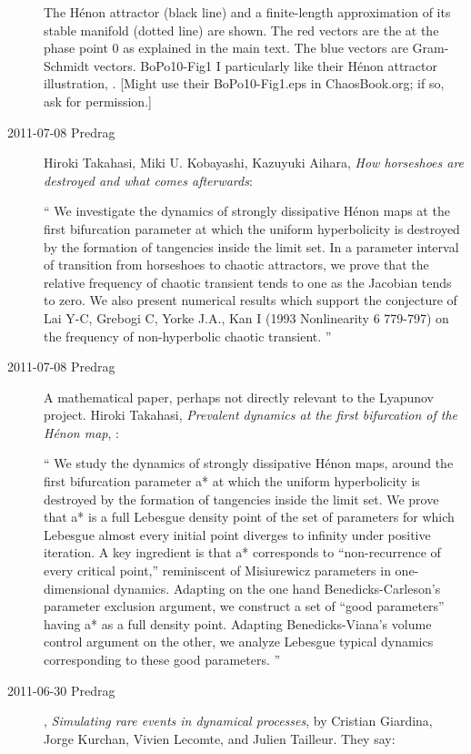 \begin{description}
%
 {}{
The H\'enon attractor (black line) and a finite-length approximation of
its stable manifold (dotted line) are shown. The red vectors are the
{\cLvs} at the phase point 0 as explained in the main text. The
blue vectors are Gram-Schmidt vectors.
}{BoPo10-Fig1}
%
I particularly like their H\'enon attractor illustration,
. [Might use their BoPo10-Fig1.eps in ChaosBook.org;
if so, ask for permission.]

\item[2011-07-08 Predrag]
Hiroki Takahasi, Miki U. Kobayashi, Kazuyuki Aihara,
\emph{How horseshoes are destroyed and what comes afterwards}:

``
We investigate the dynamics of strongly dissipative H\'enon maps at the
first bifurcation parameter at which the uniform hyperbolicity is
destroyed by the formation of tangencies inside the limit set. In a
parameter interval of transition from horseshoes to chaotic attractors,
we prove that the relative frequency of chaotic transient tends to one as
the Jacobian tends to zero. We also present numerical results which
support the conjecture of Lai Y-C, Grebogi C, Yorke J.A., Kan I (1993
Nonlinearity 6 779-797) on the frequency of non-hyperbolic chaotic
transient.
''

\item[2011-07-08 Predrag]
A mathematical paper, perhaps not directly relevant to the Lyapunov
project.
Hiroki Takahasi,
\emph{Prevalent dynamics at the first bifurcation of the H\'enon map},
:

``
We study the dynamics of strongly dissipative H\'enon maps, around the
first bifurcation parameter a* at which the uniform hyperbolicity is
destroyed by the formation of tangencies inside the limit set. We prove
that a* is a full Lebesgue density point of the set of parameters for
which Lebesgue almost every initial point diverges to infinity under
positive iteration. A key ingredient is that a* corresponds to
``non-recurrence of every critical point,'' reminiscent of Misiurewicz
parameters in one-dimensional dynamics. Adapting on the one hand
Benedicks-Carleson's parameter exclusion argument, we construct a set
of ``good parameters'' having a* as a full density point. Adapting
Benedicks-Viana's volume control argument on the other, we analyze
Lebesgue typical dynamics corresponding to these good parameters.
''

\item[2011-06-30 Predrag] ,
\emph{Simulating rare events in dynamical processes},
by Cristian Giardina, Jorge Kurchan, Vivien Lecomte,
and Julien Tailleur. They say:


\end{description}

